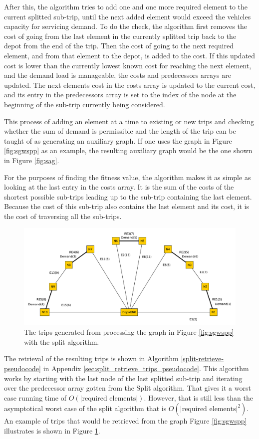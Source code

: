 After this, the algorithm tries to add one and one more required element to the current splitted sub-trip, until the next added element would exceed the vehicles capacity for servicing demand. To do the check, the algorithm first removes the cost of going from the last element in the currently splitted trip back to the depot from the end of the trip. Then the cost of going to the next required element, and from that element to the depot, is added to the cost. If this updated cost is lower than the currently lowest known cost for reaching the next element, and the demand load is manageable, the costs and predecessors arrays are updated. The next elements cost in the costs array is updated to the current cost, and its entry in the predecessors array is set to the index of the node at the beginning of the sub-trip currently being considered.

This process of adding an element at a time to existing or new trips and checking whether the sum of demand is permissible and the length of the trip can be taught of as generating an auxiliary graph. If one uses the graph in Figure \ref{fig:sgwspp} as an example, the resulting auxiliary graph would be the one shown in Figure \ref{fig:sag}.

For the purposes of finding the fitness value, the algorithm makes it as simple as looking at the last entry in the costs array. It is the sum of the costs of the shortest possible sub-trips leading up to the sub-trip containing the last element. Because the cost of this sub-trip also contains the last element and its cost, it is the cost of traversing all the sub-trips.

\begin{figure}[thbp]
    \centerline{\includegraphics[width=\textwidth]{figures/SplitIllustrations/Split_GraphWithRoutes.pdf}}
    \caption{The trips generated from processing the graph in Figure \ref{fig:sgwspp} with the split algorithm.}
    \label{fig:sgwr}
\end{figure}

The retrieval of the resulting trips is shown in Algorithm \ref{split-retrieve-pseudocode} in Appendix \ref{sec:split_retrieve_trips_pseudocode}. This algorithm works by starting with the last node of the last splitted sub-trip and iterating over the predecessor array gotten from the Split algorithm. That gives it a worst case running time of $O(|\text{required elements}|)$. However, that is still less than the asymptotical worst case of the split algorithm that is $O(|\text{required elements}|^2)$. An example of trips that would be retrieved from the graph Figure \ref{fig:sgwspp} illustrates is shown in Figure \ref{fig:sgwr}.

\cleardoublepage
